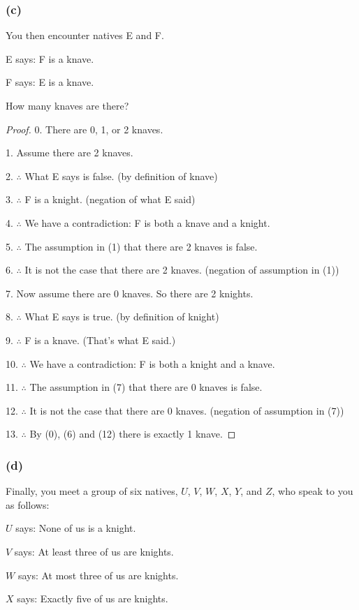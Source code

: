 \documentclass[14pt]{extarticle}
\begin{document}
\subsubsection{(c)}
You then encounter natives E and F.

E says: F is a knave.

F says: E is a knave.

How many knaves are there?

\begin{proof}
0. There are 0, 1, or 2 knaves.

1. Assume there are 2 knaves.

2. $\therefore$ What E says is false. (by definition of knave)

3. $\therefore$ F is a knight. (negation of what E said)

4. $\therefore$ We have a contradiction: F is both a knave and a knight.

5. $\therefore$ The assumption in (1) that there are 2 knaves is false.

6. $\therefore$ It is not the case that there are 2 knaves. (negation of assumption in (1))

7. Now assume there are 0 knaves. So there are 2 knights.

8. $\therefore$ What E says is true. (by definition of knight)

9. $\therefore$ F is a knave. (That's what E said.)

10. $\therefore$ We have a contradiction: F is both a knight and a knave.

11. $\therefore$ The assumption in (7) that there are 0 knaves is false.

12. $\therefore$ It is not the case that there are 0 knaves. (negation of assumption in (7))

13. $\therefore$ By (0), (6) and (12) there is exactly 1 knave. \end{proof}

\subsubsection{(d)}
Finally, you meet a group of six natives, $U$, $V$, $W$, $X$, $Y$, and $Z$, who speak to you as follows:

$U$ says: None of us is a knight.

$V$ says: At least three of us are knights.

$W$ says: At most three of us are knights.

$X$ says: Exactly five of us are knights.
\end{document}
